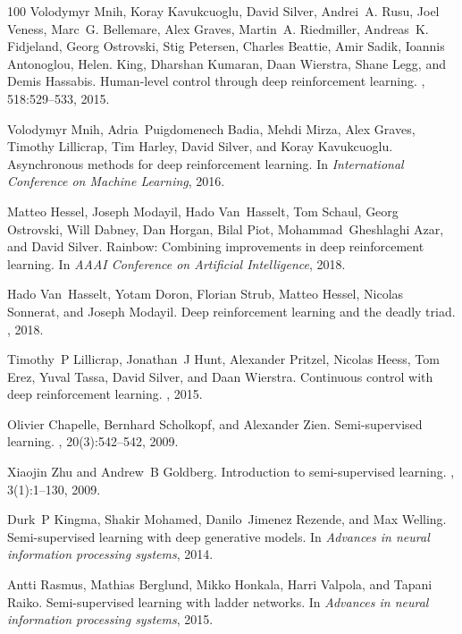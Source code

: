 \documentclass{article}
\begin{document}
{\begin{thebibliography}{100}
Volodymyr Mnih, Koray Kavukcuoglu, David Silver, Andrei~A. Rusu, Joel Veness,
  Marc~G. Bellemare, Alex Graves, Martin~A. Riedmiller, Andreas~K. Fidjeland,
  Georg Ostrovski, Stig Petersen, Charles Beattie, Amir Sadik, Ioannis
  Antonoglou, Helen. King, Dharshan Kumaran, Daan Wierstra, Shane Legg, and
  Demis Hassabis.
\newblock Human-level control through deep reinforcement learning.
, 518:529--533, 2015.

Volodymyr Mnih, Adria~Puigdomenech Badia, Mehdi Mirza, Alex Graves, Timothy
  Lillicrap, Tim Harley, David Silver, and Koray Kavukcuoglu.
\newblock Asynchronous methods for deep reinforcement learning.
\newblock In {\em International Conference on Machine Learning}, 2016.

Matteo Hessel, Joseph Modayil, Hado Van~Hasselt, Tom Schaul, Georg Ostrovski,
  Will Dabney, Dan Horgan, Bilal Piot, Mohammad~Gheshlaghi Azar, and David
  Silver.
\newblock Rainbow: Combining improvements in deep reinforcement learning.
\newblock In {\em AAAI Conference on Artificial Intelligence}, 2018.

Hado Van~Hasselt, Yotam Doron, Florian Strub, Matteo Hessel, Nicolas Sonnerat,
  and Joseph Modayil.
\newblock Deep reinforcement learning and the deadly triad.
, 2018.

Timothy~P Lillicrap, Jonathan~J Hunt, Alexander Pritzel, Nicolas Heess, Tom
  Erez, Yuval Tassa, David Silver, and Daan Wierstra.
\newblock Continuous control with deep reinforcement learning.
, 2015.

Olivier Chapelle, Bernhard Scholkopf, and Alexander Zien.
\newblock Semi-supervised learning.
, 20(3):542--542, 2009.

Xiaojin Zhu and Andrew~B Goldberg.
\newblock Introduction to semi-supervised learning.
, 3(1):1--130, 2009.

Durk~P Kingma, Shakir Mohamed, Danilo~Jimenez Rezende, and Max Welling.
\newblock Semi-supervised learning with deep generative models.
\newblock In {\em Advances in neural information processing systems}, 2014.

Antti Rasmus, Mathias Berglund, Mikko Honkala, Harri Valpola, and Tapani Raiko.
\newblock Semi-supervised learning with ladder networks.
\newblock In {\em Advances in neural information processing systems}, 2015.


\end{thebibliography}}
\end{document}
